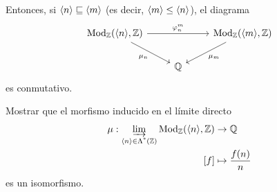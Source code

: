 Entonces, si $\langle n\rangle\sqsubseteq \langle m\rangle$ (es decir, $\langle m\rangle\leq\langle n\rangle$),
el diagrama
\[
    \begin{tikzcd}
      \Mod_\Z(\<n\>,\Z) \ar[rr,"{\phi_n^m}"] \ar[dr,"\mu_n"']
      && \Mod_\Z(\<m\>,\Z) \ar[dl,"\mu_m"] \\
      & \Q
    \end{tikzcd}
\]
es conmutativo.

\begin{exe}%
  Mostrar que el morfismo inducido en el límite directo
  \begin{align*}
      \mu : \varinjlim_{\langle n\rangle\in\Lambda^{\text{*}}({\mathbb Z})}\mathrm{Mod}_\mathbb Z(\langle n\rangle,\mathbb Z)
        &\to \mathbb Q \\
      [f] &\mapsto \frac{f(n)}{n}
  \end{align*}
  es un isomorfismo.
\end{exe}
